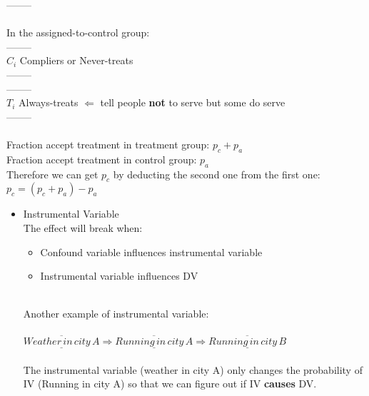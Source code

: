 \begin{itemize}
    \hspace*{0.4cm}  --------\\  
     \\
    In the assigned-to-control group:\\
    \hspace*{0.4cm}  --------\\
    \hspace*{0.4cm} \textbar \textbar \textbar \textbar \textbar $C_i$ \hspace{0.9cm} Compliers or Never-treats\\
    \hspace*{0.4cm}  --------\\    
    \hspace*{0.4cm}  --------\\
    \hspace*{0.5cm}$T_i$ \textbar \textbar \textbar \textbar \hspace{1.1cm} Always-treats $\Longleftarrow$ tell people \textbf{not} to serve but some do serve \\
    \hspace*{0.4cm}  --------\\  
     \\
    Fraction accept treatment in treatment group: $p_c + p_a$\\
    Fraction accept treatment in control group: $p_a$\\
    Therefore we can get $p_c$ by deducting the second one from the first one: $p_c = (p_c + p_a) - p_a$
\end{itemize}

\begin{itemize}
    \item Instrumental Variable\\
    The effect will break when:
    \begin{itemize}
        \item Confound variable influences instrumental variable
        \item Instrumental variable influences DV 
    \end{itemize}
     \\
    Another example of instrumental variable:\\
     \\
    $\overline{\underline{Weather\, in\, city\, A}} \Longrightarrow \overline{\underline{Running\, in\, city\, A}} \Longrightarrow \overline{\underline{Running\, in\, city\, B}} $\\
     \\
    The instrumental variable (weather in city A) only changes the probability of IV (Running in city A) so that we can figure out if IV \textbf{causes} DV.
\end{itemize}

